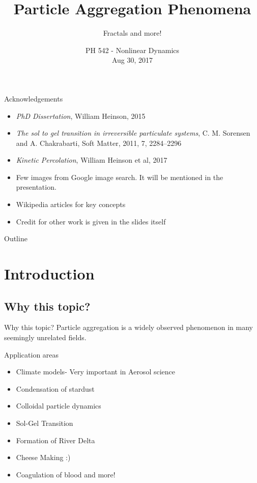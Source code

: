 \documentclass{beamer}
\title{Particle Aggregation Phenomena}
\subtitle{Fractals and more!}
\author{ Gowtham Kuntumalla \and 140100091 \\ Kiran Ahire \and \and \and \and \and  15I120007 \\ Sukanya Kudva \and \and \and   160260026 \\  Aditya Venkatraman \and  16B030029 }
\date{PH 542 - Nonlinear Dynamics \\ Aug 30, 2017}
\begin{document}
\begin{frame}
  \titlepage
\end{frame}

\begin{frame}{Acknowledgements}
  \begin{itemize}
  \item {\emph{PhD Dissertation}, William Heinson, 2015}
  \item {\emph{The sol to gel transition in irreversible particulate systems}, C. M. Sorensen and A. Chakrabarti, Soft Matter, 2011, 7, 2284–2296}
  \item{\emph{Kinetic Percolation}, William Heinson et al, 2017 }
  \item {Few images from Google image search. It will be mentioned in the presentation.}
  \item{Wikipedia articles for key concepts}
  \item{Credit for other work is given in the slides itself}
  \end{itemize}
\end{frame}

\begin{frame}{Outline}
  \tableofcontents
\end{frame}

\section{Introduction}

\subsection{Why this topic?}

\begin{frame}{Why this topic?}
  Particle aggregation is a widely observed phenomenon in many seemingly unrelated fields. \\ 
  \vspace{15pt}
  
   Application areas 
  \begin{itemize}
      \item{
      Climate models- Very important in Aerosol science
      }
      \item{
      Condensation of stardust
      }
      \item{
      Colloidal particle dynamics
      }
      \item{
      Sol-Gel Transition
      }
      \item{
      Formation of River Delta
      }
      \item{
      Cheese Making :)
      }
      \item{
      Coagulation of blood and more!
      }
  \end{itemize}
\end{frame}
\end{document}
